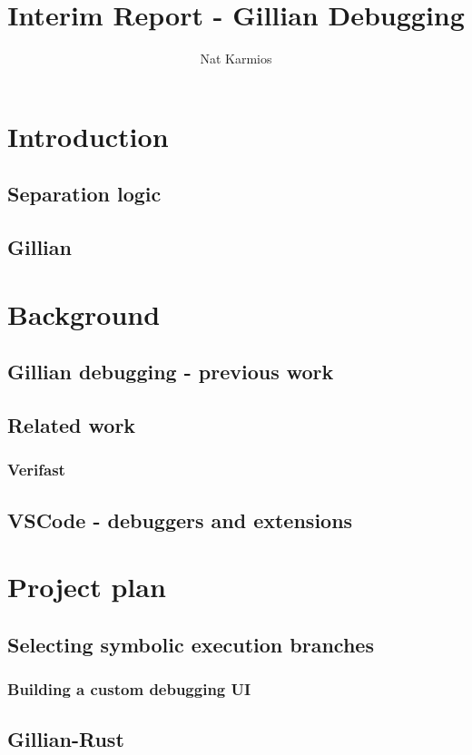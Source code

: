 \documentclass[a4paper, twoside]{report}
\title{Interim Report - Gillian Debugging}
\author{Nat Karmios}
\begin{document}
\tableofcontents

\chapter{Introduction}
\section{Separation logic}
\section{Gillian}

\chapter{Background}
\section{Gillian debugging - previous work}

\section{Related work}
\subsection{Verifast}

\section{VSCode - debuggers and extensions}

\chapter{Project plan}
\section{Selecting symbolic execution branches}
\subsection{Building a custom debugging UI}

\section{Gillian-Rust}
\end{document}
